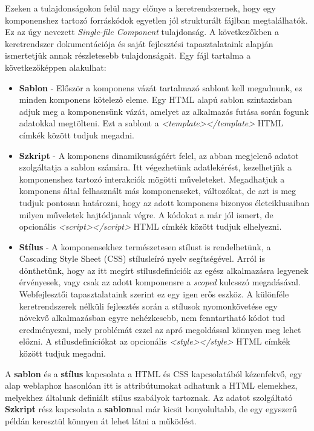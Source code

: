 \documentclass[12pt]{article}
\begin{document}
Ezeken a tulajdonságokon felül nagy előnye a keretrendszernek, hogy egy komponenshez tartozó forráskódok egyetlen jól strukturált fájlban megtalálhatók. Ez az úgy nevezett \textit{Single-file Component} tulajdonság. A következőkben a keretrendszer dokumentációja \cite{VUE_DOCS} és saját fejlesztési tapasztalataink alapján ismertetjük annak részletesebb tulajdonságait. Egy fájl tartalma a következőképpen alakulhat:
\begin{itemize}
	\item[]\textbf{Sablon}
	- Először a komponens vázát tartalmazó sablont kell megadnunk, ez minden komponens kötelező eleme. Egy HTML alapú sablon szintaxisban adjuk meg a komponensünk vázát, amelyet az alkalmazás futása során fogunk adatokkal megtölteni. Ezt a sablont a \textit{<template></template>} HTML címkék között tudjuk megadni.
	\item[]\textbf{Szkript}
	- A komponens dinamikusságáért felel, az abban megjelenő adatot szolgáltatja a sablon számára. Itt végezhetünk adatlekérést, kezelhetjük a komponenshez tartozó interakciók mögötti műveleteket. Megadhatjuk a komponens által felhasznált más komponenseket, változókat, de azt is meg tudjuk pontosan határozni, hogy az adott komponens bizonyos életciklusaiban milyen műveletek hajtódjanak végre. A kódokat a már jól ismert, de opcionális  \textit{<script></script>} HTML címkék között tudjuk elhelyezni. 
	\item[]\textbf{Stílus}
	- A komponensekhez természetesen stílust is rendelhetünk, a Cascading Style Sheet (CSS) stílusleíró nyelv segítségével. Arról is dönthetünk, hogy az itt megírt stílusdefiníciók az egész alkalmazásra legyenek érvényesek, vagy csak az adott komponensre a \textit{scoped} kulcsszó megadásával. Webfejlesztői tapasztalataink szerint ez egy igen erős eszköz. A különféle keretrendszerek nélküli fejlesztés során a stílusok nyomonkövetése egy növekvő alkalmazásban egyre nehézkesebb, nem fenntartható kódot tud eredményezni, mely problémát ezzel az apró megoldással könnyen meg lehet előzni. A stílusdefiníciókat az opcionális \textit{<style></style>} HTML címkék között tudjuk megadni.
\end{itemize}

A \textbf{sablon} és a \textbf{stílus} kapcsolata a HTML és CSS kapcsolatából kézenfekvő, egy alap weblaphoz hasonlóan itt is attribútumokat adhatunk a HTML elemekhez, melyekhez általunk definiált stílus szabályok tartoznak. Az adatot szolgáltató \textbf{Szkript} rész kapcsolata a \textbf{sablon}nal már kicsit bonyolultabb, de egy egyszerű példán keresztül könnyen át lehet látni a működést.
\end{document}
